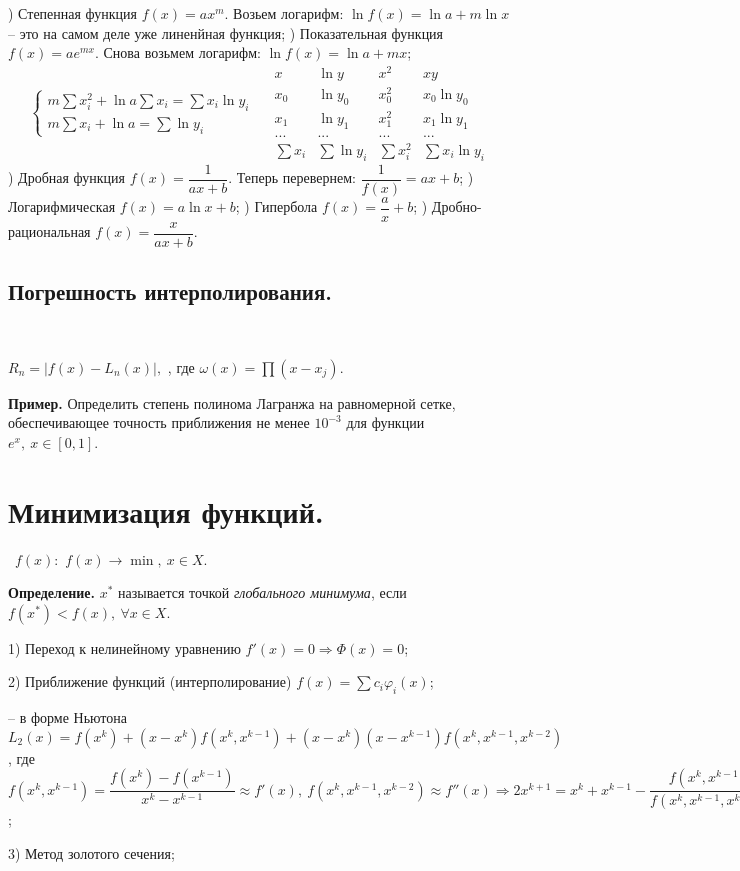 \documentclass[9pt]{article}
\begin{document}
) Степенная функция \(f(x)=ax^m\). Возьем логарифм: \(\ln f(x)=\ln a+m\ln x\) -- это на самом деле уже линенйная функция;
) Показательная функция \(f(x)=ae^{mx}\). Снова возьмем логарифм: \(\ln f(x)=\ln a + mx\);
\[\left\{\begin{array}{l}
    m\sum x_i^2+\ln a\sum x_i=\sum x_i\ln y_i \\
    m\sum x_i+\ln a=\sum \ln y_i
\end{array}\right.\quad\begin{array}{c|c|c|c}
    x & \ln y & x^2 & xy\\
    \hline
    x_0 & \ln y_0 & x_0^2 & x_0\ln y_0 \\
    x_1 & \ln y_1 & x_1^2 & x_1\ln y_1 \\
    ... & ... & ... & ... \\
    \hline
    \sum x_i & \sum \ln y_i & \sum x_i^2 & \sum x_i\ln y_i
\end{array}\]
) Дробная функция \(f(x)=\dfrac{1}{ax+b}\). Теперь перевернем: \(\dfrac{1}{f(x)}=ax+b\);
) Логарифмическая \(f(x)=a\ln x+b\);
) Гипербола \(f(x)=\dfrac{a}{x}+b\);
) Дробно-рациональная \(f(x)=\dfrac{x}{ax+b}\).

\subsection{Погрешность интерполирования.}

\ 
\par\(R_n=|f(x)-L_n(x)|,\) , где \(\omega(x)=\prod(x-x_j)\).
\par\textbf{Пример.} Определить степень полинома Лагранжа на равномерной сетке, обеспечивающее точность приближения не менее \(10^{-3}\) для функции \(e^x,\ x\in[0,1]\).

\section{Минимизация функций.}

\ 
 \(f(x):\) \(f(x)\to\min,\ x\in X\).
\par\textbf{Определение.} \(x^*\) называется точкой \textit{глобального минимума}, если \(f(x^*)<f(x),\ \forall x\in X\).
\par1) Переход к нелинейному уравнению \(f'(x) = 0\Rightarrow \Phi(x)=0\);
\par2) Приближение функций (интерполирование) \(f(x)=\sum c_i\varphi_i(x)\);
\par-- в форме Ньютона \(L_2(x)=f(x^k)+(x-x^k)f(x^k,x^{k-1})+(x-x^k)(x-x^{k-1})f(x^k,x^{k-1},x^{k-2})\), где \(f(x^k,x^{k-1})=\dfrac{f(x^k)-f(x^{k-1})}{x^k-x^{k-1}}\approx f'(x),\ f(x^k,x^{k-1},x^{k-2})\approx f''(x)\Rightarrow 2x^{k+1}=x^k+x^{k-1}-\dfrac{f(x^k,x^{k-1})}{f(x^k,x^{k-1},x^{k-2})}\);
\par3) Метод золотого сечения;
\end{document}
